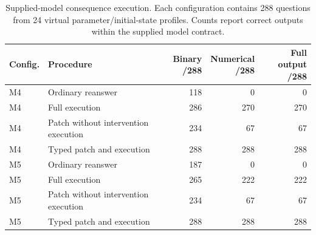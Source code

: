 \begin{table}[htbp]
\centering
\small
\caption{Supplied-model consequence execution. Each configuration contains 288 questions from 24
virtual parameter/initial-state profiles. Counts report correct outputs within the
supplied model contract.}
\label{tab:historical_model}
\setlength{\tabcolsep}{5pt}
\begin{tabularx}{\linewidth}{@{}lXrrr@{}}
\toprule
Config. & Procedure & \shortstack{Binary\\/288} & \shortstack{Numerical\\/288} & \shortstack{Full output\\/288} \\
\midrule
M4 & Ordinary reanswer & 118 & 0 & 0 \\
M4 & Full execution & 286 & 270 & 270 \\
M4 & Patch without intervention execution & 234 & 67 & 67 \\
M4 & Typed patch and execution & 288 & 288 & 288 \\
\addlinespace
M5 & Ordinary reanswer & 187 & 0 & 0 \\
M5 & Full execution & 265 & 222 & 222 \\
M5 & Patch without intervention execution & 234 & 67 & 67 \\
M5 & Typed patch and execution & 288 & 288 & 288 \\
\bottomrule
\end{tabularx}
\end{table}
